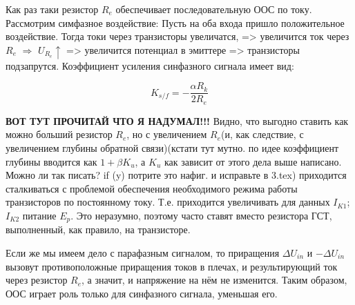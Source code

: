 Как раз таки резистор $R_e$ обеспечивает последовательную ООС по току. Рассмотрим симфазное воздействие: Пусть на оба входа пришло положительное воздействие. Тогда токи через транзисторы увеличатся, => увеличится ток через $R_e$ $\Rightarrow$ $U_{R_e} \uparrow$ => увеличится потенциал в эмиттере => транзисторы подзапрутся. Коэффициент усиления синфазного сигнала имеет вид:

$$
K_{s/f} = -\frac{\alpha R_k}{2R_e}
$$

\textbf{ВОТ ТУТ ПРОЧИТАЙ ЧТО Я НАДУМАЛ!!!}
Видно, что выгодно ставить как можно больший резистор $R_e$, но с увеличением $R_e$(и, как следствие, с увеличением глубины обратной связи)(кстати тут мутно. по идее коэффициент глубины вводится как $1 + \beta K_u$, а $K_u$ как зависит от этого дела выше написано. Можно ли так писать? if (y) потрите это нафиг. и исправьте в 3.tex) приходится сталкиваться с проблемой обеспечения необходимого режима работы транзисторов по постоянному току. Т.е. приходится увеличивать для данных $I_{K1}$; $I_{K2}$ питание $E_p$. Это неразумно, поэтому часто ставят вместо резистора ГСТ, выполненный, как правило, на транзисторе.

Если же мы имеем дело с парафазным сигналом, то приращения $\Delta U_{in}$ и $-\Delta U_{in}$ вызовут противоположные приращения токов в плечах, и результирующий ток через резистор $R_e$, а значит, и напряжение на нём не изменится. Таким образом, ООС играет роль только для синфазного сигнала, уменьшая его.  


